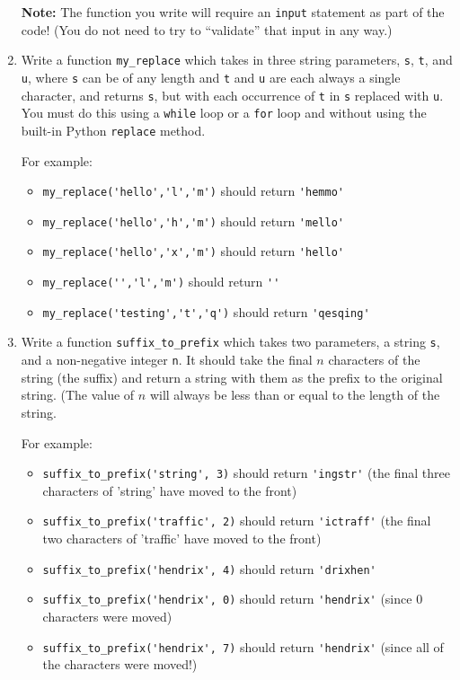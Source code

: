\documentclass{article}
\begin{document}
\begin{enumerate}
\textbf{Note:} The function you write will require an \verb|input| statement as part of the code! (You do not need to try to ``validate'' that input in any way.)



\item  Write a function \verb|my_replace| which takes in three string parameters, \verb|s|, \verb|t|, and \verb|u|, where \verb|s| can be of any length and \verb|t| and \verb|u| are each always a single character, and returns \verb|s|, but with each occurrence of  \verb|t| in \verb|s| replaced with \verb|u|. You must do this using a \verb|while| loop or a \verb|for| loop and without using the built-in Python \verb|replace| method.

For example:

\begin{itemize}
  \item  \verb|my_replace('hello','l','m')| should return \verb|'hemmo'|
  \item  \verb|my_replace('hello','h','m')| should return \verb|'mello'|
  \item  \verb|my_replace('hello','x','m')| should return \verb|'hello'|
  \item  \verb|my_replace('','l','m')| should return \verb|''|
  \item  \verb|my_replace('testing','t','q')| should return \verb|'qesqing'|
\end{itemize}

\item Write a function \verb|suffix_to_prefix| which takes two parameters, a string \verb|s|, and a non-negative integer \verb|n|. It should take the final $n$ characters of the string (the suffix) and return a string with them as the prefix to the original string. (The value of $n$ will always be less than or equal to the length of the string.

For example:

\begin{itemize}
\item \verb|suffix_to_prefix('string', 3)| should return \verb|'ingstr'|  (the final three characters of 'string' have moved to the front)
\item \verb|suffix_to_prefix('traffic', 2)| should return \verb|'ictraff'| (the final two characters of 'traffic' have moved to the front)
\item \verb|suffix_to_prefix('hendrix', 4)| should return \verb|'drixhen'|
\item \verb|suffix_to_prefix('hendrix', 0)| should return \verb|'hendrix'| (since 0 characters were moved)
\item \verb|suffix_to_prefix('hendrix', 7)| should return \verb|'hendrix'| (since all of the characters were moved!)
\end{itemize}




\end{enumerate}
\end{document}
